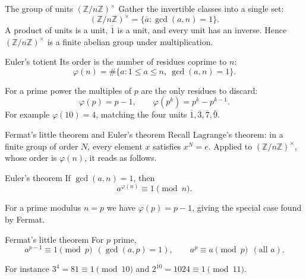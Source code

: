 \documentclass[aspectratio=169,11pt]{beamer}
\newcommand{\Z}{\mathbb Z}
\begin{document}
\begin{frame}{The group of units \((\Z/n\Z)^\times\)}
  \small
  Gather the invertible classes into a single set:
  \[
    \boxed{(\Z/n\Z)^\times
      =\{\overline a:\gcd(a,n)=1\}.}
  \]
  A product of units is a unit, \(\overline1\) is a unit, and every unit has
  an inverse.  Hence \((\Z/n\Z)^\times\) is a finite \alert{abelian group}
  under multiplication.

  \begin{block}{Euler's totient}
    Its order is the number of residues coprime to \(n\):
    \[
      \varphi(n)
        =\#\{a:1\le a\le n,\ \gcd(a,n)=1\}.
    \]
  \end{block}

  For a prime power the multiples of \(p\) are the only residues to discard:
  \[
    \varphi(p)=p-1,
    \qquad
    \varphi(p^k)=p^k-p^{k-1}.
  \]
  For example \(\varphi(10)=4\), matching the four units
  \(\overline1,\overline3,\overline7,\overline9\).
\end{frame}

\begin{frame}{Fermat's little theorem and Euler's theorem}
  \small
  Recall Lagrange's theorem: in a finite group of order \(N\), every element
  \(x\) satisfies \(x^{N}=e\).  Applied to \((\Z/n\Z)^\times\), whose order is
  \(\varphi(n)\), it reads as follows.

  \begin{alertblock}{Euler's theorem}
    If \(\gcd(a,n)=1\), then
    \[
      \boxed{a^{\varphi(n)}\equiv1\pmod n.}
    \]
  \end{alertblock}

  For a prime modulus \(n=p\) we have \(\varphi(p)=p-1\), giving the special
  case found by Fermat.

  \begin{block}{Fermat's little theorem}
    For \(p\) prime,
    \[
      a^{p-1}\equiv1\pmod p\ \ (\gcd(a,p)=1),
      \qquad
      a^{p}\equiv a\pmod p\ \ (\text{all }a).
    \]
  \end{block}

  For instance \(3^{4}=81\equiv1\pmod{10}\) and
  \(2^{10}=1024\equiv1\pmod{11}\).
\end{frame}
\end{document}
